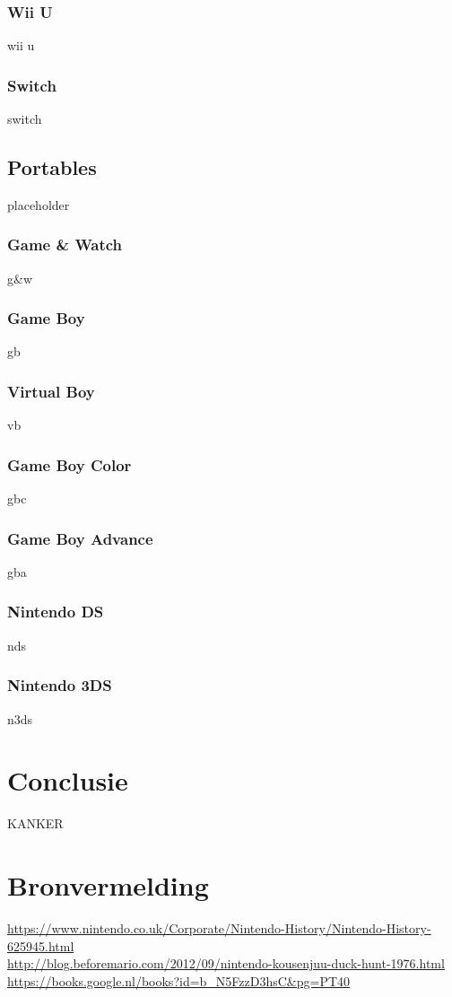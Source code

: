 \documentclass{article}
\begin{document}
\subsubsection{Wii U}
wii u
\subsubsection{Switch}
switch

\subsection{Portables}
placeholder
\subsubsection{Game \& Watch}
g\&w
\subsubsection{Game Boy}
gb
\subsubsection{Virtual Boy}
vb
\subsubsection{Game Boy Color}
gbc
\subsubsection{Game Boy Advance}
gba
\subsubsection{Nintendo DS}
nds
\subsubsection{Nintendo 3DS}
n3ds
\section{Conclusie}
KANKER
\section{Bronvermelding}
\url{https://www.nintendo.co.uk/Corporate/Nintendo-History/Nintendo-History-625945.html}\\ 
\url{http://blog.beforemario.com/2012/09/nintendo-kousenjuu-duck-hunt-1976.html}\\ 
\url{https://books.google.nl/books?id=b_N5FzzD3hsC&pg=PT40}\\ 
\end{document}
